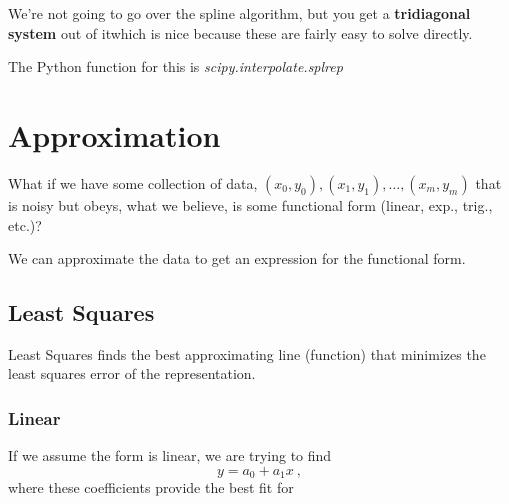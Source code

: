 \documentclass[12pt]{exam}
\begin{document}
We're not going to go over the spline algorithm, but you get a \textbf{tridiagonal system} out of it\textemdash which is nice because these are fairly easy to solve directly. %

The Python function for this is \textit{scipy.interpolate.splrep}


\section*{Approximation}

What if we have some collection of data, $(x_0, y_0), (x_1, y_1),\dots, (x_m, y_m)$ that is noisy but obeys, what we believe, is some functional form (linear, exp., trig., etc.)?

We can approximate the data to get an expression for the functional form.

\subsection*{Least Squares}
\ifprintanswers
Least Squares finds the best approximating line (function) that minimizes the least squares error of the representation.
\else
\vspace*{3em}
\fi

\subsubsection*{Linear}
If we assume the form is linear, we are trying to find
\[y = a_0 + a_1 x \:,\]
where these coefficients provide the best fit for
 
\end{document}
